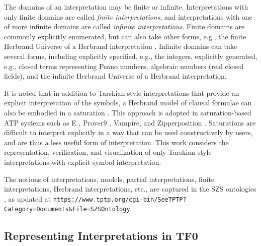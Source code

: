 \documentclass[letterpaper]{article}
\newcommand{\smalltt}[1]{\small \texttt{#1}}
\begin{document}
The domains of an interpretation may be finite or infinite.
Interpretations with only finite domains are called {\em finite interpretations}, and
interpretations with one of more infinite domains are called {\em infinite interpretations}.
Finite domains are commonly explicitly enumerated, but can also take other forms, e.g., the 
finite Herbrand Universe of a Herbrand interpretation \cite{Her30}.
Infinite domains can take several forms, including explicitly specified, e.g., the integers,
explicitly generated, e.g., closed terms representing Peano numbers, algebraic numbers (real
closed fields), and the infinite Herbrand Universe of a Herbrand interpretation.

It is noted that in addition to Tarskian-style interpretations that provide an explicit
interpretation of the symbols, a Herbrand model of clausal formulae can also be embodied in a 
saturation \cite{BG+01}.
This approach is adopted in saturation-based ATP systems such as E \cite{SCV19}, 
Prover9 \cite{McC-Prover9-URL}, Vampire, and Zipperposition \cite{VB+21}.
Saturations are difficult to interpret explicitly in a way that can be used constructively by 
users, and are thus a less useful form of interpretation.
This work considers the representation, verification, and visualization of only Tarskian-style 
interpretations with explicit symbol interpretation.

The notions of interpretations, models, partial interpretations, finite interpretations,
Herbrand interpretations, etc., are captured in the SZS ontologies \cite{Sut08-KEAPPA}, as
updated at \smalltt{https://www.tptp.org/cgi-bin/SeeTPTP? Category=Documents\&File=SZSOntology}

 
\subsection{Representing Interpretations in TF0}
\label{InterpretationsTF0}
\end{document}
